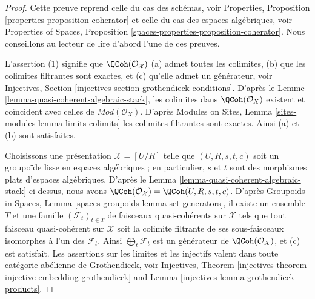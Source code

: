 \begin{proof}
Cette preuve reprend celle du cas des schémas, voir
Properties, Proposition \ref{properties-proposition-coherator}
et celle du cas des espaces algébriques, voir
Properties of Spaces, Proposition
\ref{spaces-properties-proposition-coherator}.
Nous conseillons au lecteur de lire d'abord l'une de ces preuves.

\medskip\noindent
L'assertion (1) signifie que $\QCoh(\mathcal{O}_\mathcal{X})$ (a) admet toutes les colimites,
(b) que les colimites filtrantes sont exactes, et (c) qu'elle admet un générateur, voir
Injectives, Section \ref{injectives-section-grothendieck-conditions}.
D'après le Lemme \ref{lemma-quasi-coherent-algebraic-stack},
les colimites dans $\QCoh(\mathcal{O}_X)$ existent et coïncident
avec celles de $\textit{Mod}(\mathcal{O}_X)$. D'après
Modules on Sites, Lemma \ref{sites-modules-lemma-limits-colimits}
les colimites filtrantes sont exactes. Ainsi (a) et (b) sont satisfaites.

\medskip\noindent
Choisissons une présentation $\mathcal{X} = [U/R]$ telle que $(U, R, s, t, c)$
soit un groupoïde lisse en espaces algébriques ; en particulier, $s$ et $t$
sont des morphismes plats d'espaces algébriques. D'après le
Lemma \ref{lemma-quasi-coherent-algebraic-stack}
ci-dessus, nous avons
$\QCoh(\mathcal{O}_\mathcal{X}) = \QCoh(U, R, s, t, c)$.
D'après Groupoids in Spaces, Lemma \ref{spaces-groupoids-lemma-set-generators},
il existe un ensemble $T$ et une famille $(\mathcal{F}_t)_{t \in T}$ de
faisceaux quasi-cohérents sur $\mathcal{X}$ tels que tout faisceau quasi-cohérent
sur $\mathcal{X}$ soit la colimite filtrante de ses sous-faisceaux
isomorphes à l'un des $\mathcal{F}_t$.
Ainsi $\bigoplus_t \mathcal{F}_t$ est
un générateur de $\QCoh(\mathcal{O}_X)$, et (c) est satisfait.
Les assertions sur les limites et les injectifs valent dans toute
catégorie abélienne de Grothendieck, voir
Injectives, Theorem
\ref{injectives-theorem-injective-embedding-grothendieck} and
Lemma \ref{injectives-lemma-grothendieck-products}.


\end{proof}
